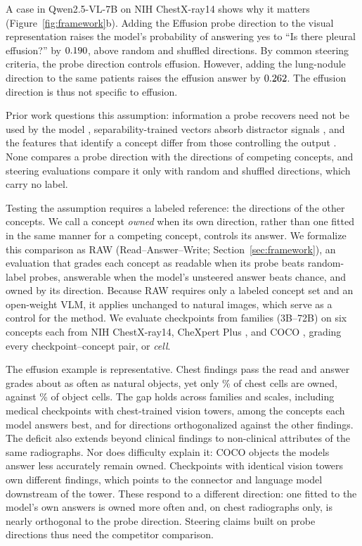 A case in Qwen2.5-VL-7B \citep{bai2025qwen25vl} on NIH ChestX-ray14 \citep{wang2017chestxray} shows why it matters (Figure~\ref{fig:framework}b). Adding the Effusion probe direction to the visual representation raises the model's probability of answering yes to ``Is there pleural effusion?'' by $0.190$, above random and shuffled directions. By common steering criteria, the probe direction controls effusion. However, adding the lung-nodule direction to the same patients raises the effusion answer by $0.262$. The effusion direction is thus not specific to effusion.

Prior work questions this assumption: information a probe recovers need not be used by the model \citep{ravichander2021probing}, separability-trained vectors absorb distractor signals \citep{pahde2025navigating}, and the features that identify a concept differ from those controlling the output \citep{arad2025saes}. None compares a probe direction with the directions of competing concepts, and steering evaluations compare it only with random and shuffled directions, which carry no label.

Testing the assumption requires a labeled reference: the directions of the other concepts. We call a concept \emph{owned} when its own direction, rather than one fitted in the same manner for a competing concept, controls its answer. We formalize this comparison as RAW (Read--Answer--Write; Section~\ref{sec:framework}), an evaluation that grades each concept as readable when its probe beats random-label probes, answerable when the model's unsteered answer beats chance, and owned by its direction. Because RAW requires only a labeled concept set and an open-weight VLM, it applies unchanged to natural images, which serve as a control for the method. We evaluate \cfCheckpoints{} checkpoints from \cfFamiliesWord{} families (3B--72B) on six concepts each from NIH ChestX-ray14, CheXpert Plus \citep{chambon2024chexpertplus}, and COCO \citep{lin2014coco}, grading every checkpoint--concept pair, or \emph{cell}.

The effusion example is representative. Chest findings pass the read and answer grades about as often as natural objects, yet only \cfChestOwnedPct\% of chest cells are owned, against \cfCocoOwnedPct\% of object cells. The gap holds across families and scales, including medical checkpoints with chest-trained vision towers, among the concepts each model answers best, and for directions orthogonalized against the other findings. The deficit also extends beyond clinical findings to non-clinical attributes of the same radiographs. Nor does difficulty explain it: COCO objects the models answer less accurately remain owned. Checkpoints with identical vision towers own different findings, which points to the connector and language model downstream of the tower. These respond to a different direction: one fitted to the model's own answers is owned more often and, on chest radiographs only, is nearly orthogonal to the probe direction. Steering claims built on probe directions thus need the competitor comparison.

